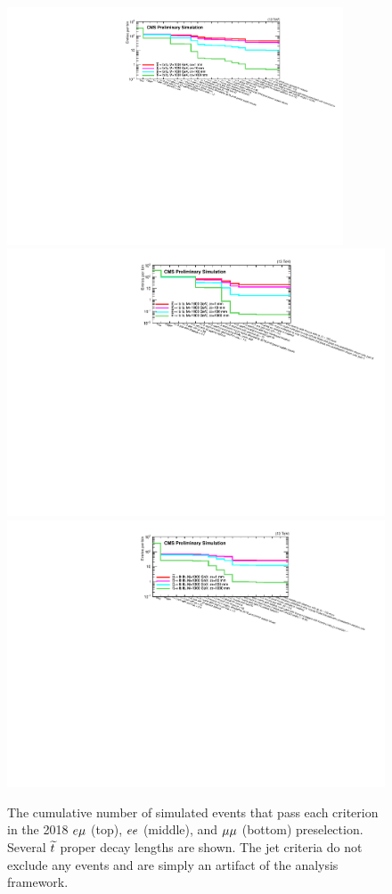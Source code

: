\begin{figure}
\includegraphics[width=0.89\textwidth]{figures/selection/preselection/signal/cutFlow_2018EMuPreselection_1000GeV.pdf}
\includegraphics[width=\textwidth]{figures/selection/preselection/signal/cutFlow_2018EEPreselection_1000GeV.pdf}
\includegraphics[width=\textwidth]{figures/selection/preselection/signal/cutFlow_2018MuMuPreselection_1000GeV.pdf}
\caption{The cumulative number of simulated \stoptolb events that pass each criterion in the 2018 $e{\mu}$ (top), $ee$ (middle), and ${\mu}{\mu}$ (bottom) preselection. Several $\widetilde{t}$ proper decay lengths are shown. The jet criteria do not exclude any events and are simply an artifact of the analysis framework.}
\label{signal_cutflow}
\end{figure}